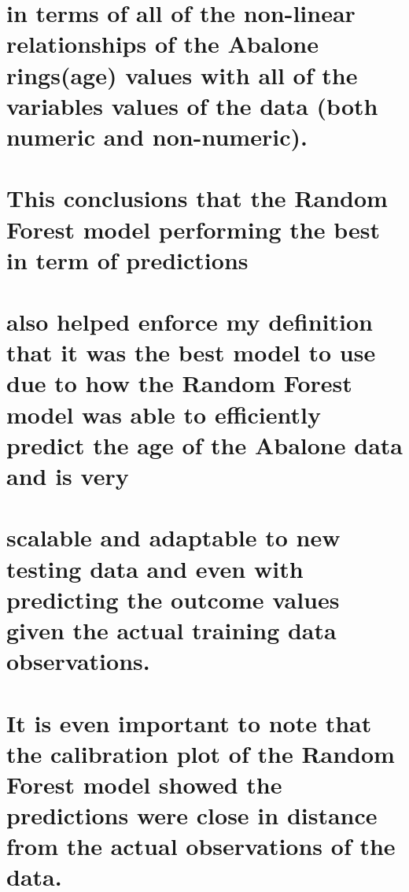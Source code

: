 \documentclass[
  letterpaper,
  DIV=11,
  numbers=noendperiod]{scrreprt}
\begin{document}
{\chapter{in terms of all of the non-linear relationships of the Abalone
rings(age) values with all of the variables values of the data (both
numeric and
non-numeric).}\label{in-terms-of-all-of-the-non-linear-relationships-of-the-abalone-ringsage-values-with-all-of-the-variables-values-of-the-data-both-numeric-and-non-numeric.}


\chapter{This conclusions that the Random Forest model performing the
best in term of
predictions}\label{this-conclusions-that-the-random-forest-model-performing-the-best-in-term-of-predictions}


\chapter{also helped enforce my definition that it was the best model to
use due to how the Random Forest model was able to efficiently predict
the age of the Abalone data and is
very}\label{also-helped-enforce-my-definition-that-it-was-the-best-model-to-use-due-to-how-the-random-forest-model-was-able-to-efficiently-predict-the-age-of-the-abalone-data-and-is-very}


\chapter{scalable and adaptable to new testing data and even with
predicting the outcome values given the actual training data
observations.}\label{scalable-and-adaptable-to-new-testing-data-and-even-with-predicting-the-outcome-values-given-the-actual-training-data-observations.}


\chapter{It is even important to note that the calibration plot of the
Random Forest model showed the predictions were close in distance from
the actual observations of the
data.}\label{it-is-even-important-to-note-that-the-calibration-plot-of-the-random-forest-model-showed-the-predictions-were-close-in-distance-from-the-actual-observations-of-the-data.}

}
\end{document}
